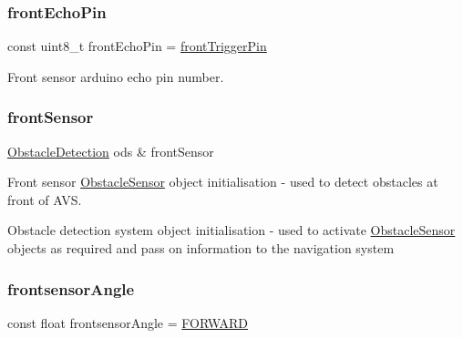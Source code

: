 \mbox{\label{bot_main_8ino_a878ae4b68ec48fc902c4aa953ad565b4}} 
\subsubsection{\texorpdfstring{front\+Echo\+Pin}{frontEchoPin}}
{\footnotesize\ttfamily const uint8\+\_\+t front\+Echo\+Pin = \mbox{\hyperlink{bot_main_8ino_a33df7a8dbfd90327fda79c01f944f56a}{front\+Trigger\+Pin}}}



Front sensor arduino echo pin number. 

\mbox{\label{bot_main_8ino_a355879266d10af4a6e9126a47bc09113}} 
\subsubsection{\texorpdfstring{front\+Sensor}{frontSensor}}
{\footnotesize\ttfamily \mbox{\hyperlink{class_obstacle_detection}{Obstacle\+Detection}} ods \& front\+Sensor}



Front sensor \mbox{\hyperlink{class_obstacle_sensor}{Obstacle\+Sensor}} object initialisation -\/ used to detect obstacles at front of A\+VS. 

Obstacle detection system object initialisation -\/ used to activate \mbox{\hyperlink{class_obstacle_sensor}{Obstacle\+Sensor}} objects as required and pass on information to the navigation system \mbox{\label{bot_main_8ino_ad681cfe410d5d764c513368773b9de93}} 
\subsubsection{\texorpdfstring{frontsensor\+Angle}{frontsensorAngle}}
{\footnotesize\ttfamily const float frontsensor\+Angle = \mbox{\hyperlink{bot_main_8ino_a6ddfdda7a062d10cff4a72b76b44aeb8}{F\+O\+R\+W\+A\+RD}}}



